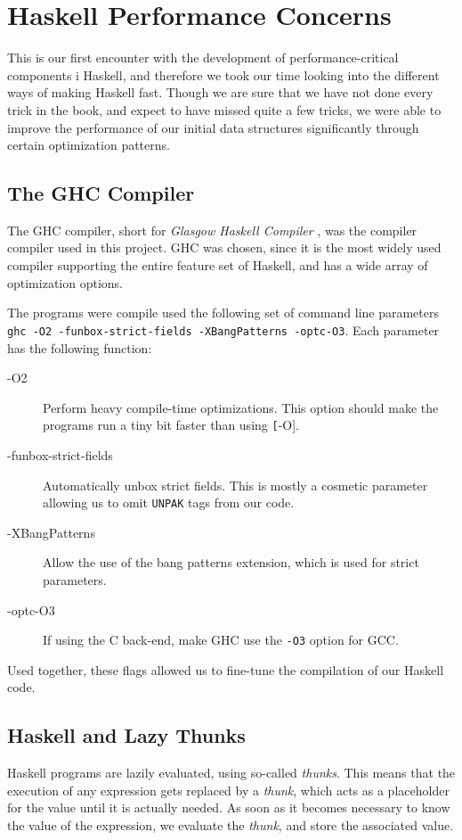 \section{Haskell Performance Concerns}

This is our first encounter with the development of performance-critical components i Haskell, and therefore we took our time looking into the different ways of making Haskell fast. Though we are sure that we have not done every trick in the book, and expect to have missed quite a few tricks, we were able to improve the performance of our initial data structures significantly through certain optimization patterns.

\subsection{The GHC Compiler}
The GHC compiler, short for \textit{Glasgow Haskell Compiler} \citep{ghc}, was the compiler compiler used  in this project. GHC was chosen, since it is the most widely used compiler supporting the entire feature set of Haskell, and has a wide array of optimization options.

The programs were compile used the following set of command line parameters \texttt{ghc -O2 -funbox-strict-fields -XBangPatterns -optc-O3}. Each parameter has the following function:
\begin{description}
\item[-O2] Perform heavy compile-time optimizations. This option should make the programs run a tiny bit faster than using \texttt[-O].
\item[-funbox-strict-fields] Automatically unbox strict fields. This is mostly a cosmetic parameter allowing us to omit \texttt{UNPAK} tags from our code.
\item[-XBangPatterns] Allow the use of the bang patterns extension, which is used for strict parameters.
\item[-optc-O3] If using the C back-end, make GHC use the \texttt{-O3} option for GCC.
\end{description}

Used together, these flags allowed us to fine-tune the compilation of our Haskell code.

\subsection{Haskell and Lazy Thunks}

Haskell programs are lazily evaluated, using so-called \textit{thunks}. This means that the execution of any expression gets replaced by a \textit{thunk}, which acts as a placeholder for the value until it is actually needed. As soon as it becomes necessary to know the value of the expression, we evaluate the \textit{thunk}, and store the associated value.

